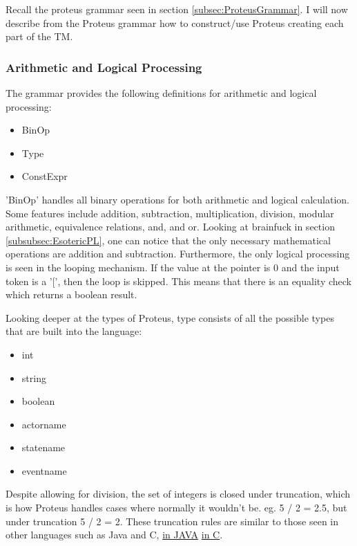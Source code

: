 Recall the proteus grammar seen in section \ref{subsec:ProteusGrammar}.
I will now describe from the Proteus grammar how to construct/use Proteus creating each part of the TM.

\subsubsection{Arithmetic and Logical Processing}\label{subsubsec:ArithLogProc}

The grammar provides the following definitions for arithmetic and logical processing:
\begin{itemize}
    \item BinOp
    \item Type
    \item ConstExpr
\end{itemize}

'BinOp' handles all binary operations for both arithmetic and logical calculation.
Some features include addition, subtraction, multiplication, division, modular arithmetic, equivalence relations, and, and or.
Looking at brainfuck in section \ref{subsubsec:EsotericPL}, one can notice that the only necessary mathematical operations are addition and subtraction.
Furthermore, the only logical processing is seen in the looping mechanism.
If the value at the pointer is 0 and the input token is a '[', then the loop is skipped.
This means that there is an equality check which returns a boolean result.

Looking deeper at the types of Proteus, type consists of all the possible types that are built into the language:
\begin{itemize}
    \item int
    \item string
    \item boolean
    \item actorname
    \item statename
    \item eventname
\end{itemize}

Despite allowing for division, the set of integers is closed under truncation, which is how Proteus handles cases where normally it wouldn't be.
eg. 5 / 2 = 2.5, but under truncation 5 / 2 = 2.
These truncation rules are similar to those seen in other languages such as Java and C, \href{https://www.javatpoint.com/what-is-truncation-in-java}{in JAVA} \href{https://www.geeksforgeeks.org/trunc-truncf-truncl-c-language/}{in C}.

